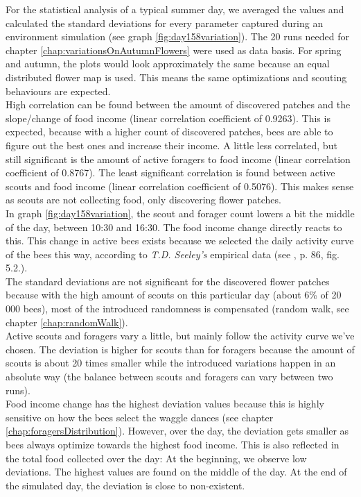 		For the statistical analysis of a typical summer day, we averaged the values and calculated the standard deviations for every parameter captured during an environment simulation (see graph \ref{fig:day158variation}). The 20 runs needed for chapter \ref{chap:variationsOnAutumnFlowers} were used as data basis. For spring and autumn, the plots would look approximately the same because an equal distributed flower map is used. This means the same optimizations and scouting behaviours are expected.\\
		High correlation can be found between the amount of discovered patches and the slope/change of food income (linear correlation coefficient of 0.9263). This is expected, because with a higher count of discovered patches, bees are able to figure out the best ones and increase their income.
		A little less correlated, but still significant is the amount of active foragers to food income (linear correlation coefficient of 0.8767). The least significant correlation is found between active scouts and food income (linear correlation coefficient of 0.5076). This makes sense as scouts are not collecting food, only discovering flower patches.\\
		In graph \ref{fig:day158variation}, the scout and forager count lowers a bit the middle of the day, between 10:30 and 16:30. The food income change directly reacts to this. This change in active bees exists because we selected the daily activity curve of the bees this way, according to \textit{T.D. Seeley's} empirical data (see \cite{seeley95}, p. 86, fig. 5.2.).\\
		
		The standard deviations are not significant for the discovered flower patches because with the high amount of scouts on this particular day (about 6\% of 20 000 bees), most of the introduced randomness is compensated (random walk, see chapter \ref{chap:randomWalk}).\\
		Active scouts and foragers vary a little, but mainly follow the activity curve we've chosen. The deviation is higher for scouts than for foragers because the amount of scouts is about 20 times smaller while the introduced variations happen in an absolute way (the balance between scouts and foragers can vary between two runs).\\
		Food income change has the highest deviation values because this is highly sensitive on how the bees select the waggle dances (see chapter \ref{chap:foragersDistribution}). However, over the day, the deviation gets smaller as bees always optimize towards the highest food income. This is also reflected in the total food collected over the day: At the beginning, we observe low deviations. The highest values are found on the middle of the day. At the end of the simulated day, the deviation is close to non-existent.
		
